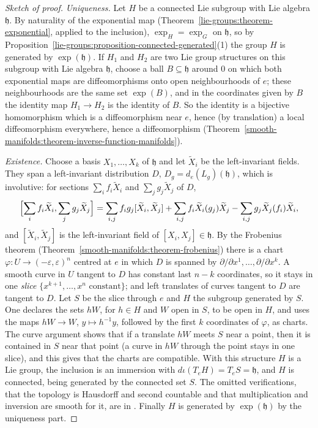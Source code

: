 \begin{proof}[Sketch of proof]
\emph{Uniqueness.} Let $H$ be a connected Lie subgroup with Lie algebra $\mathfrak{h}$. By naturality of the exponential map (Theorem~\ref{lie-groups:theorem-exponential},
applied to the inclusion), $\exp_H = \exp_G$ on $\mathfrak{h}$, so by Proposition~\ref{lie-groups:proposition-connected-generated}(1) the group $H$ is generated by
$\exp(\mathfrak{h})$. If $H_1$ and $H_2$ are two Lie group structures on this subgroup with Lie algebra $\mathfrak{h}$, choose a ball $B \subseteq \mathfrak{h}$ around $0$ on which
both exponential maps are diffeomorphisms onto open neighbourhoods of $e$; these neighbourhoods are the same set $\exp(B)$, and in the coordinates given by $B$ the
identity map $H_1 \to H_2$ is the identity of $B$. So the identity is a bijective homomorphism which is a diffeomorphism near $e$, hence (by translation) a local
diffeomorphism everywhere, hence a diffeomorphism (Theorem~\ref{smooth-manifolds:theorem-inverse-function-manifolds}).

\emph{Existence.} Choose a basis $X_1, \ldots, X_k$ of $\mathfrak{h}$ and let $\widetilde{X}_i$ be the left-invariant fields. They span a left-invariant distribution $D$,
$D_g = d_e(L_g)(\mathfrak{h})$, which is involutive: for sections $\sum_if_i\widetilde{X}_i$ and $\sum_jg_j\widetilde{X}_j$ of $D$,
\[
\Bigl[\sum_if_i\widetilde{X}_i, \sum_jg_j\widetilde{X}_j\Bigr] = \sum_{i,j}f_ig_j[\widetilde{X}_i, \widetilde{X}_j] + \sum_{i,j}f_i\widetilde{X}_i(g_j)\widetilde{X}_j - \sum_{i,j}g_j\widetilde{X}_j(f_i)\widetilde{X}_i,
\]
and $[\widetilde{X}_i, \widetilde{X}_j]$ is the left-invariant field of $[X_i, X_j] \in \mathfrak{h}$. By the Frobenius theorem
(Theorem~\ref{smooth-manifolds:theorem-frobenius}) there is a chart $\varphi \colon U \to (-\varepsilon, \varepsilon)^n$ centred at $e$ in which $D$ is spanned by
$\partial/\partial x^1, \ldots, \partial/\partial x^k$. A smooth curve in $U$ tangent to $D$ has constant last $n - k$ coordinates, so it stays in one \emph{slice}
$\{x^{k+1}, \ldots, x^n \text{ constant}\}$; and left translates of curves tangent to $D$ are tangent to $D$. Let $S$ be the slice through $e$ and $H$ the subgroup
generated by $S$. One declares the sets $hW$, for $h \in H$ and $W$ open in $S$, to be open in $H$, and uses the maps $hW \to W$, $y \mapsto h^{-1}y$, followed by the
first $k$ coordinates of $\varphi$, as charts. The curve argument shows that if a translate $hW$ meets $S$ near a point, then it is contained in $S$ near that point
(a curve in $hW$ through the point stays in one slice), and this gives that the charts are compatible. With this structure $H$ is a Lie group, the inclusion is an
immersion with $d\iota(T_eH) = T_eS = \mathfrak{h}$, and $H$ is connected, being generated by the connected set $S$. The omitted verifications, that the topology is
Hausdorff and second countable and that multiplication and inversion are smooth for it, are in \cite[Chapter 3]{warner-foundations}. Finally $H$ is generated by
$\exp(\mathfrak{h})$ by the uniqueness part.
\end{proof}

